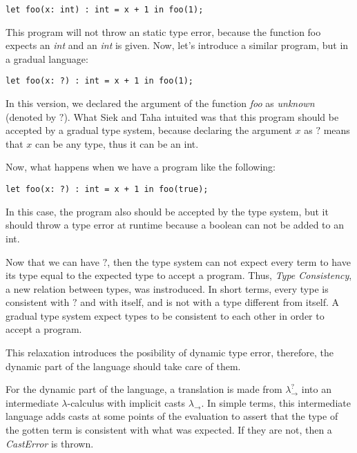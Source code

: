 \documentclass[submission]{eptcs}
\begin{document}
\begin{lstlisting}[language=Lambda]
let foo(x: int) : int = x + 1 in foo(1);
\end{lstlisting}

This program will not throw an static type error, because the function foo expects an \textit{int} and an \textit{int} is given.
Now, let's introduce a similar program, but in a gradual language:

\begin{lstlisting}[language=Lambda]
let foo(x: ?) : int = x + 1 in foo(1);
\end{lstlisting}

In this version, we declared the argument of the function \textit{foo} as \textit{unknown} (denoted by $?$).
What Siek and Taha \cite{Siek2006GradualTF} intuited was that this program should be accepted by a gradual type system, because declaring the argument $x$ as $?$ means that $x$ can be any type, thus it can be an int.

Now, what happens when we have a program like the following:

\begin{lstlisting}[language=Lambda]
let foo(x: ?) : int = x + 1 in foo(true);
\end{lstlisting}

In this case, the program also should be accepted by the type system, but it should throw a type error at runtime because a boolean can not be added to an int.

Now that we can have $?$, then the type system can not expect every term to have its type equal to the expected type to accept a program.
Thus, \textit{Type Consistency}, a new relation between types, was instroduced.
In short terms, every type is consistent with $?$ and with itself, and is not with a type different from itself.
A gradual type system expect types to be consistent to each other in order to accept a program.

This relaxation introduces the posibility of dynamic type error, therefore, the dynamic part of the language should take care of them.

For the dynamic part of the language, a translation is made from $\lambda^{?}_{\rightarrow}$ into an intermediate $\lambda$-calculus with implicit casts $\lambda^{}_{\rightarrow}$.
In simple terms, this intermediate language adds casts at some points of the evaluation to assert that the type of the gotten term is consistent with what was expected.
If they are not, then a \textit{CastError} is thrown.
\end{document}
